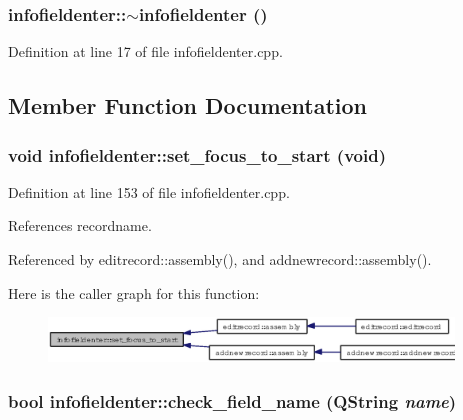 \subsubsection{\setlength{\rightskip}{0pt plus 5cm}infofieldenter::$\sim$infofieldenter ()}\label{classinfofieldenter_dc661d7f68f42cd5e280e0cab8bb5890}




Definition at line 17 of file infofieldenter.cpp.

\subsection{Member Function Documentation}
\subsubsection{\setlength{\rightskip}{0pt plus 5cm}void infofieldenter::set\_\-focus\_\-to\_\-start (void)}\label{classinfofieldenter_29b36d24b6f15fb60140f4289025a4ee}




Definition at line 153 of file infofieldenter.cpp.

References recordname.

Referenced by editrecord::assembly(), and addnewrecord::assembly().

Here is the caller graph for this function:\begin{figure}[H]
\begin{center}
\leavevmode
\includegraphics[width=305pt]{classinfofieldenter_29b36d24b6f15fb60140f4289025a4ee_icgraph}
\end{center}
\end{figure}
\subsubsection{\setlength{\rightskip}{0pt plus 5cm}bool infofieldenter::check\_\-field\_\-name (QString {\em name})}\label{classinfofieldenter_1020b1777a4f93a10b5c04308625e62c}




